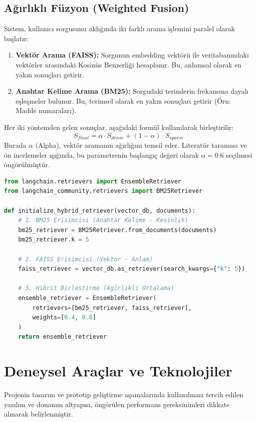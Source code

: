\documentclass[12pt,a4paper]{report}
\begin{document}
\subsection{Ağırlıklı Füzyon (Weighted Fusion)}
Sistem, kullanıcı sorgusunu aldığında iki farklı arama işlemini paralel olarak başlatır:
\begin{enumerate}
    \item \textbf{Vektör Arama (FAISS):} Sorgunun embedding vektörü ile veritabanındaki vektörler arasındaki Kosinüs Benzerliği hesaplanır. Bu, anlamsal olarak en yakın sonuçları getirir.
    \item \textbf{Anahtar Kelime Arama (BM25):} Sorgudaki terimlerin frekansına dayalı eşleşmeler bulunur. Bu, terimsel olarak en yakın sonuçları getirir (Örn: Madde numaraları).
\end{enumerate}

Her iki yöntemden gelen sonuçlar, aşağıdaki formül kullanılarak birleştirilir:
\begin{equation}
    S_{final} = \alpha \cdot S_{dense} + (1 - \alpha) \cdot S_{sparse}
\end{equation}
Burada $\alpha$ (Alpha), vektör aramanın ağırlığını temsil eder. Literatür taraması ve ön incelemeler ışığında, bu parametrenin başlangıç değeri olarak $\alpha = 0.6$ seçilmesi öngörülmüştür.

\begin{lstlisting}[language=Python, caption=Hibrit Arama İçin Öngörülen Kod Yapısı]
from langchain.retrievers import EnsembleRetriever
from langchain_community.retrievers import BM25Retriever

def initialize_hybrid_retriever(vector_db, documents):
    # 1. BM25 Erisimcisi (Anahtar Kelime - Kesinlik)
    bm25_retriever = BM25Retriever.from_documents(documents)
    bm25_retriever.k = 5
    
    # 2. FAISS Erisimcisi (Vektor - Anlam)
    faiss_retriever = vector_db.as_retriever(search_kwargs={"k": 5})
    
    # 3. Hibrit Birlestirme (Agirlikli Ortalama)
    ensemble_retriever = EnsembleRetriever(
        retrievers=[bm25_retriever, faiss_retriever],
        weights=[0.4, 0.6] 
    )
    return ensemble_retriever
\end{lstlisting}

\section{Deneysel Araçlar ve Teknolojiler}
Projenin tasarım ve prototip geliştirme aşamalarında kullanılması tercih edilen yazılım ve donanım altyapısı, öngörülen performans gereksinimleri dikkate alınarak belirlenmiştir.
\end{document}

